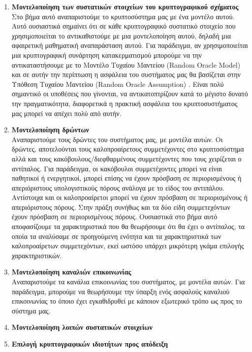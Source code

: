 \begin{enumerate}
    \item \textbf{Μοντελοποίηση των συστατικών στοιχείων του κρυπτογραφικού σχήματος}\\
    Στο βήμα αυτό αναπαριστούμε το κρυπτοσύστημα μας με ένα μοντέλο αυτού. Αυτό ουσιαστικά σημαίνει ότι σε κάθε κρυπτογραφικό συστατικό στοιχείο που χρησιμοποιείται το αντικαθιστούμε με μια μοντελοποίηση αυτού, δηλαδή μια αφαιρετική μαθηματική αναπαράσταση αυτού. Για παράδειγμα, αν χρησιμοποιείται μια κρυπτογραφική συνάρτηση κατακερματισμού μπορούμε να την αντικαταστήσουμε με το Μοντέλο Τυχαίου Μαντείου (Random Oracle Model) και σε αυτήν την περίπτωση η ασφάλεια του συστήματος μας θα βασίζεται στην Υπόθεση Τυχαίου Μαντείου (Random Oracle Assumption) \cite{10.1145/168588.168596}. Είναι πολύ σημαντικό οι υποθέσεις που γίνονται, να αντικατοπτρίζουν κατά το μέγιστο δυνατό την πραγματικότητα, διαφορετικά η πρακτική ασφάλεια του κρυπτοσυστήματος μας μπορεί να απέχει πολύ από αυτήν.
    \item \textbf{Μοντελοποίηση δρώντων}\\
    Αναπαριστούμε τους δρώντες του συστήματος μας, με μοντέλα αυτών. Οι δρώντες, αποτελούνται τους καλοπροαίρετους συμμετέχοντες στο κρυπτοσύστημα αλλά και τους κακόβουλους/διεφθαρμένους συμμετέχοντες που τους χειρίζεται ο αντίπαλος. Για παράδειγμα, οι κακόβουλοι συμμετέχοντες μπορεί να είναι παθητικοί ή ενεργητικοί, μπορεί επίσης να έχουν πρόσβαση σε περιορισμένους ή απεριόριστους υπολογιστικούς πόρους ανάλογα με το είδος του αντιπάλου. Αντίστοιχα και οι καλοπροαίρετοι μπορεί να έχουν πρόσβαση σε περιορισμένους ή απεριόριστους πόρους. Στην πράξη συνήθως και τα δύο είδη συμμετεχόντων έχουν πρόσβαση σε περιορισμένους πόρους. Ουσιαστικά στο βήμα αυτό αποφασίζουμε τα χαρακτηριστικά που θα θεωρήσουμε ότι θα έχει ο αντίπαλος, τα οποία τα αναλύσαμε σε προηγούμενη ενότητα και τα χαρακτηριστικά των καλοπροαίρετων συμμετεχόντων, εκεί ωστόσο υπάρχει μικρότερη γκάμα επιλογής χαρακτηριστικών.
    \item \textbf{Μοντελοποίηση καναλιών επικοινωνίας}\\
    Αναπαριστούμε τα κανάλια επικοινωνίας του συστήματος, με μοντέλα αυτών. Για παράδειγμα, μπορούμε να θεωρήσουμε την ύπαρξη ενός ασφαλούς καναλιού επικοινωνίας το όποιο έχει εγκαθιδρυθεί με κάποιον εξωτερικό τρόπο ως προς το σύστημα μας.
    \item \textbf{Μοντελοποίηση λοιπών συστατικών στοιχείων}\\
    \item \textbf{Επιλογή κρυπτογραφικών ιδιοτήτων προς απόδειξη}\\

\end{enumerate}
